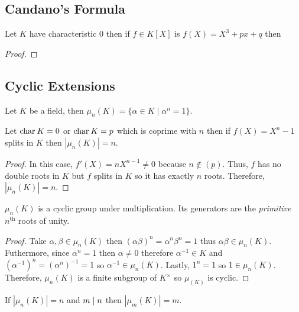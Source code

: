\documentclass[12pt]{extarticle}
\begin{document}
\subsection{Candano's Formula}

\begin{theorem}
Let $K$ have characteristic $0$ then if $f \in K[X]$ is $f(X) = X^3 + px + q$ then 
\end{theorem}

\begin{proof}

\end{proof}

\subsection{Cyclic Extensions}

\begin{definition}
Let $K$ be a field, then $\mu_n(K) = \{ \alpha \in K \mid \alpha^n = 1 \}$. 
\end{definition} 

\begin{proposition}
Let $\mathrm{char} \: K = 0$ or $\mathrm{char} \: K = p$ which is coprime with $n$ then if $f(X) = X^n - 1$ splits in $K$ then $|\mu_n(K)| = n$.
\end{proposition}

\begin{proof}
In this case, $f'(X) = n X^{n-1} \neq 0$ because $n \notin (p)$. Thus, $f$ has no double roots in $K$ but $f$ splits in $K$ so it has exactly $n$ roots. Therefore, $|\mu_n(K)| = n$. 
\end{proof}

\begin{proposition}
$\mu_n(K)$ is a cyclic group under multiplication. Its generators are the \textit{primitive} $n^{\mathrm{th}}$ roots of unity. 
\end{proposition}

\begin{proof}
Take $\alpha, \beta \in \mu_n(K)$ then $(\alpha \beta)^n = \alpha^n \beta^n = 1$ thus $\alpha \beta \in \mu_n(K)$. Futhermore, since $\alpha^n = 1$ then $\alpha \neq 0$ therefore $\alpha^{-1} \in K$ and $(\alpha^{-1})^n = (\alpha^n)^{-1} = 1$ so $\alpha^{-1} \in \mu_n(K)$. Lastly, $1^n = 1$ so $1 \in \mu_n(K)$. Therefore, $\mu_n(K)$ is a finite subgroup of $K^\times$ so $\mu_(K)$ is cyclic.  
\end{proof}

\begin{proposition}
If $|\mu_n(K)| = n$ and $m \mid n$ then $|\mu_m(K)| = m$.
\end{proposition}
\end{document}
